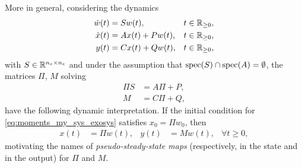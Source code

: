 More in general, considering the dynamics
\begin{subequations}\label{eq:moments_my_sys_exosys}
	\begin{align}
		\dot{w}(t) & = Sw(t), & t\in\mathbb{R}_{\geq 0},\label{eq:moments_my_sys_exosysa}    \\
		\dot{x}(t) & = Ax(t)+Pw(t), & t\in\mathbb{R}_{\geq 0},\label{eq:moments_my_sys_exosysb} \\
		y(t)       & =Cx(t)+Qw(t), & t\in\mathbb{R}_{\geq 0},\label{eq:moments_my_sys_exosysc}
	\end{align}
\end{subequations}
with $S\in\mathbb{R}^{n_e \times n_e}$ and
under the assumption that $\operatorname{spec}(S)\cap\operatorname{spec}(A)=\emptyset$,
the matrices $\Pi$, $M$ solving
\begin{subequations}\label{eq:moments_M_mod}
	\begin{align}
		\Pi S & = A\Pi + P, \label{eq:moments_M_moda}  \\
		M     & = C \Pi + Q, \label{eq:moments_M_modb}
	\end{align}
\end{subequations}
have the following dynamic interpretation.
If the initial condition for \eqref{eq:moments_my_sys_exosys} satisfies
$x_0=\Pi w_0$, then
\begin{align}
	x(t) &= \Pi w(t), & y(t) &= M w(t), & \forall t\geq0,
\end{align}
motivating the names of \emph{pseudo-steady-state maps}
(respectively, in the state and in the output) for $\Pi$ and $M$.

